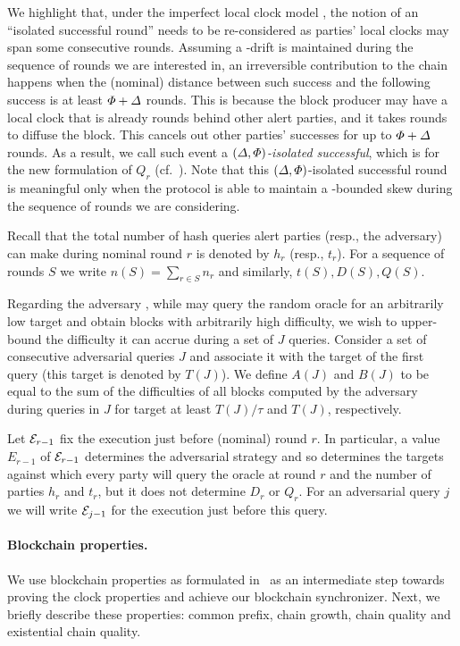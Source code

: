 We highlight that, under the imperfect local clock model \funcImpClock, the notion of an ``isolated successful round'' needs to be re-considered as parties' local clocks may span some consecutive rounds.
%
Assuming a \maxskew-drift is maintained during the sequence of rounds we are interested in, an irreversible contribution to the chain happens when the (nominal) distance between such success and the following success is at least $\varPhi + \varDelta$ rounds.
%
This is because the block producer may have a local clock that is already \maxskew rounds behind other alert parties, and it takes \delay rounds to diffuse the block.
%
This cancels out other parties' successes for up to $\varPhi + \varDelta$ rounds.
%
As a result, we call such event a \emph{$(\varDelta, \varPhi)$-isolated successful}, which is for the new formulation of $Q_r$ (cf.~\cite{EPRINT:GarKiaLeo20}).
%
Note that this $(\varDelta, \varPhi)$-isolated successful round is meaningful only when the protocol is able to maintain a \maxskew-bounded skew during the sequence of rounds we are considering.

Recall that the total number of hash queries alert parties (resp., the adversary) can make during nominal round $r$ is denoted by $h_r$ (resp., $t_r$).
%
For a sequence of rounds $S$ we write $n(S) = \sum_{r \in S} n_r$ and similarly, $t(S), D(S), Q(S)$.

Regarding the adversary \adv, while \adv may query the random oracle for an arbitrarily low target and obtain blocks with arbitrarily high difficulty, we wish to upper-bound the difficulty it can accrue during a set of $J$ queries.
%
Consider a set of consecutive adversarial queries $J$ and associate it with the target of the first query (this target is denoted by $T(J)$).
%
We define $A(J)$ and $B(J)$ to be equal to the sum of the difficulties of all blocks computed by the adversary during queries in $J$ for target at least $T(J) / \tau$ and $T(J)$, respectively.

Let $\mathcal{E}_{r - 1}$ fix the execution just before (nominal) round $r$.
%
In particular, a value $E_{r - 1}$ of $\mathcal{E}_{r - 1}$ determines the adversarial strategy and so determines the targets against which every party will query the oracle at round $r$ and the number of parties $h_r$ and $t_r$, but it does not determine $D_r$ or $Q_r$.
%
For an adversarial query $j$ we will write $\mathcal{E}_{j - 1}$ for the execution just before this query.

\paragraph{Blockchain properties.}
%
We use blockchain properties as formulated in~\cite{EC:GarKiaLeo15,C:GarKiaLeo17} as an intermediate step towards proving the clock properties and achieve our blockchain synchronizer.
%
Next, we briefly describe these properties: common prefix, chain growth, chain quality and existential chain quality.

